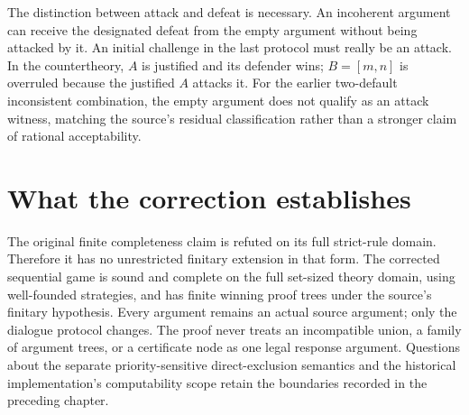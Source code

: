 The distinction between attack and defeat is necessary. An
incoherent argument can receive the designated defeat from
the empty argument without being attacked by it. An initial
challenge in the last protocol must really be an attack.
In the countertheory, \(A\) is justified and its defender wins;
\(B=[m,n]\) is overruled because the justified \(A\) attacks it.
For the earlier two-default inconsistent combination, the empty
argument does not qualify as an attack witness, matching the
source's residual classification rather than a stronger claim
of rational acceptability.

\section{What the correction establishes}

The original finite completeness claim is refuted on its full
strict-rule domain. Therefore it has no unrestricted finitary
extension in that form. The corrected sequential game is sound
and complete on the full set-sized theory domain, using
well-founded strategies, and has finite winning proof trees
under the source's finitary hypothesis.
Every argument remains an actual source argument; only the
dialogue protocol changes. The proof never treats an incompatible
union, a family of argument trees, or a certificate node as one
legal response argument.
Questions about the separate priority-sensitive direct-exclusion
semantics and the historical implementation's computability
scope retain the boundaries recorded in the preceding chapter.
